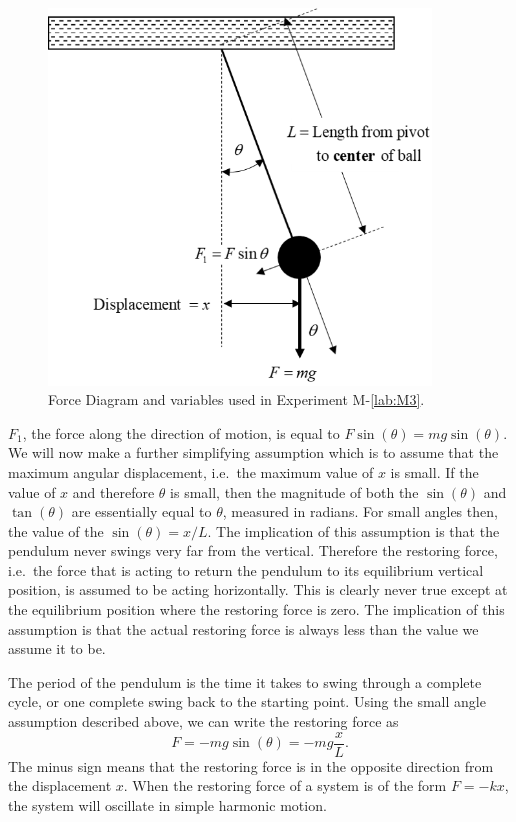 \begin{figure}
  \begin{center}  
    \includegraphics[width=4.0in]{Fall/Experiment03Figures/M10_figure1_squish_v01.png}
  \end{center}
  \caption{Force Diagram and variables used in Experiment M-\ref{lab:M3}.}
  \label{M03Fig01} %
\end{figure}

$F_{1}$, the force along the direction of motion, is equal to $F \sin(\theta) = m g \sin(\theta)$.  We will now make a further simplifying assumption which is to assume that the maximum angular displacement, i.e.\ the maximum value of $x$ is small.  If the value of $x$ and therefore $\theta$ is small, then the magnitude of both the $\sin(\theta)$ and $\tan(\theta)$ are essentially equal to $\theta$, measured in radians.  For small angles then, the value of the $\sin(\theta) = x/L$.  The implication of this assumption is that the pendulum never swings very far from the vertical.  Therefore the restoring force, i.e.\ the force that is acting to return the pendulum to its equilibrium vertical position, is assumed to be acting horizontally.  This is clearly never true except at the equilibrium position where the restoring force is zero.  The implication of this assumption is that the actual restoring force is always less than the value we assume it to be.

The period of the pendulum is the time it takes to swing through a complete cycle, or one complete swing back to the starting point.  Using the small angle assumption described above, we can write the restoring force as
\[
	F = -m g \sin(\theta) = -m g \frac{x}{L}.
\]
The minus sign means that the restoring force is in the opposite direction from the displacement $x$.  When the restoring force of a system is of the form $F = -k x$, the system will oscillate in simple harmonic motion.

